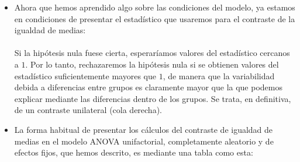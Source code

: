 \begin{itemize}

    \item Ahora que hemos aprendido algo sobre las condiciones del modelo, ya estamos en condiciones de presentar el estadístico que usaremos para el contraste de la igualdad de medias:\\[3mm]
        \\[3mm]
        Si la hipótesis nula fuese cierta, esperaríamos valores del estadístico cercanos a $1$. Por lo tanto, rechazaremos la hipótesis nula si se obtienen valores del estadístico suficientemente mayores que $1$, de manera que la variabilidad debida a diferencias entre grupos es claramente mayor que la que podemos explicar mediante las diferencias dentro de los grupos. Se trata, en definitiva, {\sf de un contraste unilateral} (cola derecha).


    \item La forma habitual de presentar los cálculos del contraste de igualdad de medias en el modelo ANOVA unifactorial, completamente aleatorio y de efectos fijos, que hemos descrito, es mediante una tabla como esta:
    \end{itemize}

